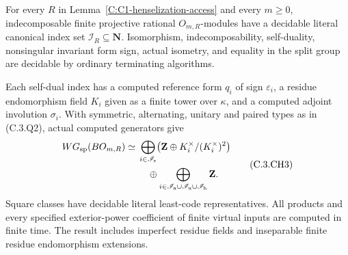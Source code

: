 \begin{theorem}
\label{C:C1-henselization-WG}
For every $R$ in Lemma~\ref{C:C1-henselization-access}
and every $m\geq0$, indecomposable finite projective
rational $O_{m,R}$-modules have a decidable literal
canonical index set $\mathscr I_R\subseteq\mathbf N$.
Isomorphism, indecomposability, self-duality,
nonsingular invariant form sign, actual isometry,
and equality in the split group are decidable
by ordinary terminating algorithms.

Each self-dual index has a computed reference form
$q_i$ of sign $\varepsilon_i$, a residue
endomorphism field $K_i$ given as a finite tower
over $\kappa$, and a computed adjoint involution
$\sigma_i$.  With symmetric, alternating, unitary
and paired types as in (C.3.Q2), actual computed
generators give
\[
 \begin{split}
 WG_{\rm sp}(BO_{m,R})\simeq{}&
 \bigoplus_{i\in\mathscr I_{\rm s}}
       \bigl(\mathbf Z\oplus K_i^\times/(K_i^\times)^2\bigr)\\
 &\quad\oplus
 \bigoplus_{i\in\mathscr I_{\rm a}\cup
                  \mathscr I_{\rm u}\cup
                  \mathscr I_{\rm h}}\mathbf Z.
 \end{split}                                                \tag{C.3.CH3}
\]
Square classes have decidable literal least-code
representatives.  All products and every specified
exterior-power coefficient of finite virtual inputs
are computed in finite time.  The result includes
imperfect residue fields and inseparable finite
residue endomorphism extensions.
\end{theorem}
